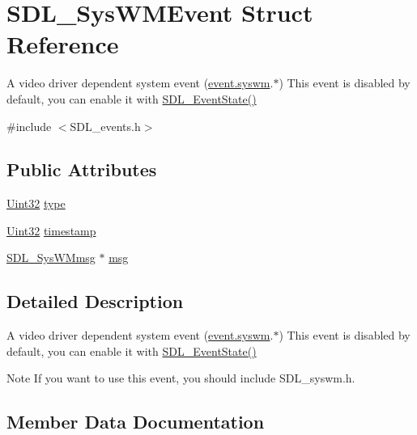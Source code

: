 \hypertarget{struct_s_d_l___sys_w_m_event}{}\section{S\+D\+L\+\_\+\+Sys\+W\+M\+Event Struct Reference}
\label{struct_s_d_l___sys_w_m_event}


A video driver dependent system event (\hyperlink{union_s_d_l___event_ab3b2eaf5348d4c50a51b1f297fdef537}{event.\+syswm}.$\ast$) This event is disabled by default, you can enable it with \hyperlink{_s_d_l__events_8h_afb772893e1c46f186fa39a4defe76df3}{S\+D\+L\+\_\+\+Event\+State()}  




{\ttfamily \#include $<$S\+D\+L\+\_\+events.\+h$>$}

\subsection*{Public Attributes}
\begin{DoxyCompactItemize}
\item 
\hyperlink{_s_d_l__stdinc_8h_add440eff171ea5f55cb00c4a9ab8672d}{Uint32} \hyperlink{struct_s_d_l___sys_w_m_event_a84697e96cb16bf6a570e10b5bfdcd392}{type}
\item 
\hyperlink{_s_d_l__stdinc_8h_add440eff171ea5f55cb00c4a9ab8672d}{Uint32} \hyperlink{struct_s_d_l___sys_w_m_event_a5d3cb97006d99b620c2671c27bd82c06}{timestamp}
\item 
\hyperlink{struct_s_d_l___sys_w_mmsg}{S\+D\+L\+\_\+\+Sys\+W\+Mmsg} $\ast$ \hyperlink{struct_s_d_l___sys_w_m_event_ad5e3dc68aa15582cd0641847d41c74e8}{msg}
\end{DoxyCompactItemize}


\subsection{Detailed Description}
A video driver dependent system event (\hyperlink{union_s_d_l___event_ab3b2eaf5348d4c50a51b1f297fdef537}{event.\+syswm}.$\ast$) This event is disabled by default, you can enable it with \hyperlink{_s_d_l__events_8h_afb772893e1c46f186fa39a4defe76df3}{S\+D\+L\+\_\+\+Event\+State()} 

\begin{DoxyNote}{Note}
If you want to use this event, you should include S\+D\+L\+\_\+syswm.\+h. 
\end{DoxyNote}


\subsection{Member Data Documentation}

